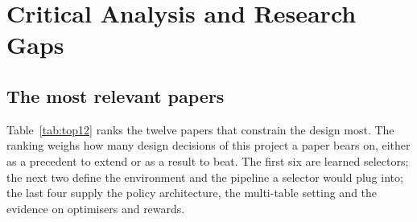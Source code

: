 \chapter{Critical Analysis and Research Gaps}
\label{ch:gaps}

\section{The most relevant papers}

Table~\ref{tab:top12} ranks the twelve papers that constrain the design most. The ranking weighs how many design decisions of this project a paper bears on, either as a precedent to extend or as a result to beat. The first six are learned selectors; the next two define the environment and the pipeline a selector would plug into; the last four supply the policy architecture, the multi-table setting and the evidence on optimisers and rewards.

